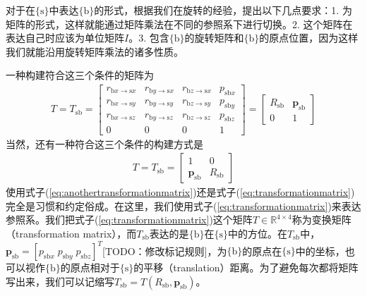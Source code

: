 \documentclass[12pt, a4paper, article, UTF8]{ctexart}
\begin{document}
对于在$\{\text{s}\}$中表达$\{\text{b}\}$的形式，根据我们在旋转的经验，提出以下几点要求：1. 为矩阵的形式，这样就能通过矩阵乘法在不同的参照系下进行切换。2. 这个矩阵在表达自己时应该为单位矩阵$I$。3. 包含$\{\text{b}\}$的旋转矩阵和$\{\text{b}\}$的原点位置，因为这样我们就能沿用旋转矩阵乘法的诸多性质。

一种构建符合这三个条件的矩阵为
\begin{align}
T = T_\text{sb}= \begin{bmatrix}
r_{\text{b}x\rightarrow\text{s}x} & r_{\text{b}y\rightarrow\text{s}x} & r_{\text{b}z\rightarrow\text{s}x} & p_{\text{sb}x}\\
r_{\text{b}x\rightarrow\text{s}y} & r_{\text{b}y\rightarrow\text{s}y} & r_{\text{b}z\rightarrow\text{s}y} & p_{\text{sb}y}\\
r_{\text{b}x\rightarrow\text{s}z} & r_{\text{b}y\rightarrow\text{s}z} & r_{\text{b}z\rightarrow\text{s}z} & p_{\text{sb}z}\\
0&0&0&1
\end{bmatrix} = 
\begin{bmatrix}
R_\text{sb}& \mathbf{p}_\text{sb} \\
0 & 1
\end{bmatrix} \label{eq:transformationmatrix}
\end{align}
当然，还有一种符合这三个条件的构建方式是
\begin{align}
T = T_\text{sb} = \begin{bmatrix}
 1 & 0 \\
\mathbf{p}_\text{sb} & R_\text{sb}
\end{bmatrix} \label{eq:anothertransformationmatrix}
\end{align}
使用式子(\ref{eq:anothertransformationmatrix})还是式子(\ref{eq:transformationmatrix})完全是习惯和约定俗成。在这里，我们使用式子(\ref{eq:transformationmatrix})来表达参照系。我们把式子(\ref{eq:transformationmatrix})这个矩阵$T\in\mathbb{R}^{4\times 4}$称为变换矩阵（transformation matrix），而$T_\text{sb}$表达的是$\{\text{b}\}$在$\{\text{s}\}$中的方位。在$T_\text{sb}$中，$\mathbf{p}_\text{sb} = [p_{\text{sb}x}\; p_{\text{sb}y}\; p_{\text{sb}z}]^T$[TODO：修改标记规则]，为$\{\text{b}\}$的原点在$\{\text{s}\}$中的坐标，也可以视作$\{\text{b}\}$的原点相对于$\{\text{s}\}$的平移（translation）距离。为了避免每次都将矩阵写出来，我们可以记缩写$T_\text{sb}=T(R_\text{sb}, \mathbf{p}_\text{sb})$。
\end{document}
